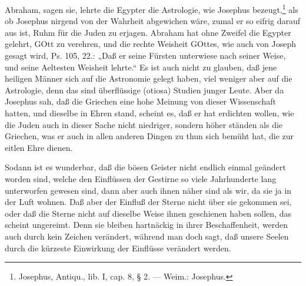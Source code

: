 Abraham, sagen sie, lehrte die Egypter die Astrologie, wie Josephus bezeugt,\footnote{Josephus, Antiqu., lib. I, cap. 8, § 2. — Weim.: Josephus.} als ob Josephus nirgend von der Wahrheit abgewichen wäre, zumal er so eifrig darauf aus ist, Ruhm für die Juden zu erjagen. Abraham hat ohne Zweifel die Egypter gelehrt, GOtt zu verehren, und die rechte Weisheit GOttes, wie auch von Joseph gesagt wird, Ps. 105, 22.: „Daß er seine Fürsten unterwiese nach seiner Weise, und seine Aeltesten Weisheit lehrte.“ Es ist auch nicht zu glauben, daß jene heiligen Männer sich auf die Astronomie gelegt haben, viel weniger aber auf die Astrologie, denn das sind überflüssige (otiosa) Studien junger Leute. Aber da Josephus sah, daß die Griechen eine hohe Meinung von dieser Wissenschaft hatten, und dieselbe in Ehren stand, scheint es, daß er hat erdichten wollen, wie die Juden auch in dieser Sache nicht niedriger, sondern höher ständen als die Griechen, was er auch in allen anderen Dingen zu thun sich bemüht hat, die zur eitlen Ehre dienen.

Sodann ist es wunderbar, daß die bösen Geister nicht endlich einmal geändert worden sind, welche den Einflüssen der Gestirne so viele Jahrhunderte lang unterworfen gewesen sind, dann aber auch ihnen näher sind als wir, da sie ja in der Luft wohnen. Daß aber der Einfluß der Sterne nicht über sie gekommen sei, oder daß die Sterne nicht auf dieselbe Weise ihnen geschienen haben sollen, das scheint ungereimt. Denn sie bleiben hartnäckig in ihrer Beschaffenheit, werden auch durch kein Zeichen verändert, während man doch sagt, daß unsere Seelen durch die kürzeste Einwirkung der Einflüsse verändert werden.

